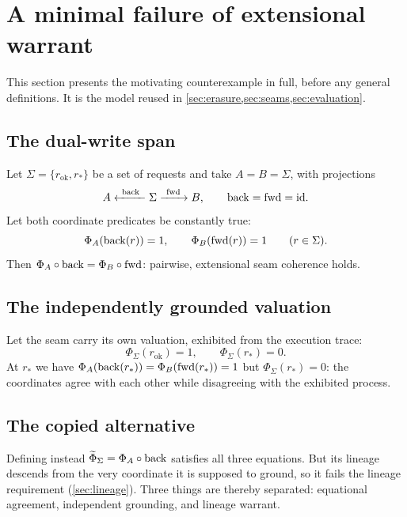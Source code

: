 \section{A minimal failure of extensional warrant}\label{sec:example}

This section presents the motivating counterexample in full, before any general definitions. It is the model reused in \cref{sec:erasure,sec:seams,sec:evaluation}.

\subsection{The dual-write span}
Let $\Sigma = \{r_{\mathrm{ok}}, r_*\}$ be a set of requests and take $A = B = \Sigma$, with projections
\[
A \xleftarrow{\ \mathrm{back}\ } \Sigma \xrightarrow{\ \mathrm{fwd}\ } B, \qquad \mathrm{back} = \mathrm{fwd} = \mathrm{id}.
\]
Let both coordinate predicates be constantly true:
\[
\Phi_A(\mathrm{back}(r)) = 1, \qquad \Phi_B(\mathrm{fwd}(r)) = 1 \qquad (r \in \Sigma).
\]
Then $\Phi_A \circ \mathrm{back} = \Phi_B \circ \mathrm{fwd}$: pairwise, extensional seam coherence holds.

\subsection{The independently grounded valuation}
Let the seam carry its own valuation, exhibited from the execution trace:
\[
\Phi_\Sigma(r_{\mathrm{ok}}) = 1, \qquad \Phi_\Sigma(r_*) = 0.
\]
At $r_*$ we have $\Phi_A(\mathrm{back}(r_*)) = \Phi_B(\mathrm{fwd}(r_*)) = 1$ but $\Phi_\Sigma(r_*) = 0$: the coordinates agree with each other while disagreeing with the exhibited process.

\subsection{The copied alternative}
Defining instead $\widetilde{\Phi}_\Sigma = \Phi_A \circ \mathrm{back}$ satisfies all three equations. But its lineage descends from the very coordinate it is supposed to ground, so it fails the lineage requirement (\cref{sec:lineage}). Three things are thereby separated: equational agreement, independent grounding, and lineage warrant.

